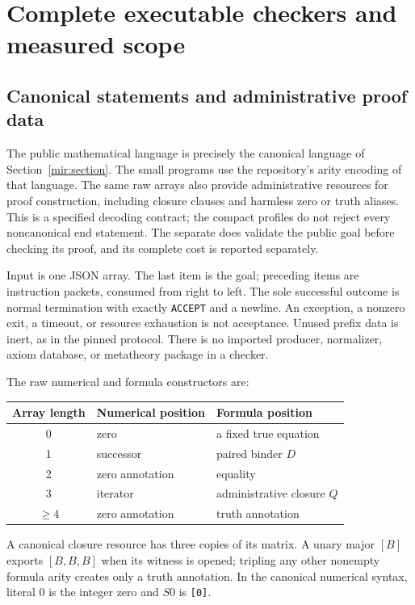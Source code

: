 \section{Complete executable checkers and measured scope}
\label{sec:implementation}

\subsection{Canonical statements and administrative proof data}

The public mathematical language is precisely the canonical language
of Section~\ref{mir:section}.  The small programs use the repository's
arity encoding of that language.  The same raw arrays also provide
administrative resources for proof construction, including closure
clauses and harmless zero or truth aliases.  This is a specified decoding
contract; the compact profiles do not reject every noncanonical
end statement.  The separate  does validate
the public goal before checking its proof, and its complete cost is
reported separately.

Input is one JSON array.  The last item is the goal; preceding items
are instruction packets, consumed from right to left.  The sole
successful outcome is normal termination with exactly
\texttt{ACCEPT} and a newline.  An exception, a nonzero exit, a timeout,
or resource exhaustion is not acceptance.  Unused prefix data is
inert, as in the pinned protocol.  There is no imported producer,
normalizer, axiom database, or metatheory package in a checker.

The raw numerical and formula constructors are:
\begin{center}
\begin{tabular}{cll}
\toprule
Array length & Numerical position & Formula position\\
\midrule
0 & zero & a fixed true equation\\
1 & successor & paired binder $D$\\
2 & zero annotation & equality\\
3 & iterator & administrative closure $Q$\\
$\ge4$ & zero annotation & truth annotation\\
\bottomrule
\end{tabular}
\end{center}
A canonical closure resource has three copies of its matrix.  A unary
major $[B]$ exports $[B,B,B]$ when its witness is opened; tripling any
other nonempty formula arity creates only a truth annotation.  In the
canonical numerical syntax, literal $0$ is the integer zero and
$S0$ is \texttt{[0]}.


